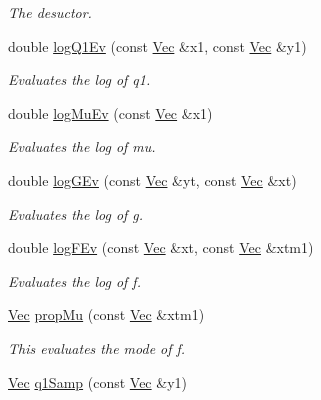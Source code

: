 \begin{DoxyCompactItemize}
\begin{DoxyCompactList}\small\item\em The desuctor. \end{DoxyCompactList}\item 
double \hyperlink{classSVolAPFFilter_ade59e30d3d1517a0c64fc44bc027d53c}{log\+Q1\+Ev} (const \hyperlink{pmfs_8h_a4c7df05c6f5e8a0d15ae14bcdbc07152}{Vec} \&x1, const \hyperlink{pmfs_8h_a4c7df05c6f5e8a0d15ae14bcdbc07152}{Vec} \&y1)
\begin{DoxyCompactList}\small\item\em Evaluates the log of q1. \end{DoxyCompactList}\item 
double \hyperlink{classSVolAPFFilter_ac019751d65847aabfb4a5b4cdcfbcf4c}{log\+Mu\+Ev} (const \hyperlink{pmfs_8h_a4c7df05c6f5e8a0d15ae14bcdbc07152}{Vec} \&x1)
\begin{DoxyCompactList}\small\item\em Evaluates the log of mu. \end{DoxyCompactList}\item 
double \hyperlink{classSVolAPFFilter_ac0b9ba8b7fcb918c011bb662f3306d19}{log\+G\+Ev} (const \hyperlink{pmfs_8h_a4c7df05c6f5e8a0d15ae14bcdbc07152}{Vec} \&yt, const \hyperlink{pmfs_8h_a4c7df05c6f5e8a0d15ae14bcdbc07152}{Vec} \&xt)
\begin{DoxyCompactList}\small\item\em Evaluates the log of g. \end{DoxyCompactList}\item 
double \hyperlink{classSVolAPFFilter_a575cd624bfc47497ac32213627df6a65}{log\+F\+Ev} (const \hyperlink{pmfs_8h_a4c7df05c6f5e8a0d15ae14bcdbc07152}{Vec} \&xt, const \hyperlink{pmfs_8h_a4c7df05c6f5e8a0d15ae14bcdbc07152}{Vec} \&xtm1)
\begin{DoxyCompactList}\small\item\em Evaluates the log of f. \end{DoxyCompactList}\item 
\hyperlink{pmfs_8h_a4c7df05c6f5e8a0d15ae14bcdbc07152}{Vec} \hyperlink{classSVolAPFFilter_a5a5d8ac387f71cb64d8da66c38bbff71}{prop\+Mu} (const \hyperlink{pmfs_8h_a4c7df05c6f5e8a0d15ae14bcdbc07152}{Vec} \&xtm1)
\begin{DoxyCompactList}\small\item\em This evaluates the mode of f. \end{DoxyCompactList}\item 
\hyperlink{pmfs_8h_a4c7df05c6f5e8a0d15ae14bcdbc07152}{Vec} \hyperlink{classSVolAPFFilter_a9da55ac2cfbc51ce0bc65a335942b1b6}{q1\+Samp} (const \hyperlink{pmfs_8h_a4c7df05c6f5e8a0d15ae14bcdbc07152}{Vec} \&y1)

\end{DoxyCompactItemize}
